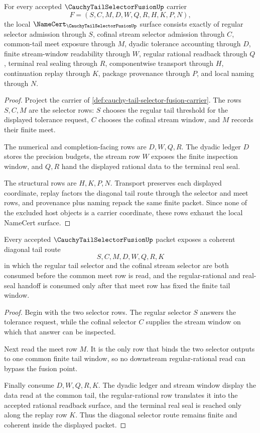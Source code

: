 \begin{theorem}
\label{thm:cauchy-tail-selector-fusion-namecert-obligations}
For every accepted $\CauchyTailSelectorFusionUp$ carrier
$$
F=(S,C,M,D,W,Q,R,H,K,P,N),
$$
the local $\NameCert_{\CauchyTailSelectorFusionUp}$ surface consists exactly of regular selector admission through $S$, cofinal stream selector admission through $C$, common-tail meet exposure through $M$, dyadic tolerance accounting through $D$, finite stream-window readability through $W$, regular rational readback through $Q$, terminal real sealing through $R$, componentwise transport through $H$, continuation replay through $K$, package provenance through $P$, and local naming through $N$.
\end{theorem}
\begin{proof}
Project the carrier of \autoref{def:cauchy-tail-selector-fusion-carrier}. The rows $S,C,M$ are the selector rows: $S$ chooses the regular tail threshold for the displayed tolerance request, $C$ chooses the cofinal stream window, and $M$ records their finite meet.

The numerical and completion-facing rows are $D,W,Q,R$. The dyadic ledger $D$ stores the precision budgets, the stream row $W$ exposes the finite inspection window, and $Q,R$ hand the displayed rational data to the terminal real seal.

The structural rows are $H,K,P,N$. Transport preserves each displayed coordinate, replay factors the diagonal tail route through the selector and meet rows, and provenance plus naming repack the same finite packet. Since none of the excluded host objects is a carrier coordinate, these rows exhaust the local NameCert surface.
\end{proof}

\begin{theorem}
\label{thm:cauchy-tail-selector-fusion-selector-coherence}
Every accepted $\CauchyTailSelectorFusionUp$ packet exposes a coherent diagonal tail route
$$
S,C,M,D,W,Q,R,K
$$
in which the regular tail selector and the cofinal stream selector are both consumed before the common meet row is read, and the regular-rational and real-seal handoff is consumed only after that meet row has fixed the finite tail window.
\end{theorem}
\begin{proof}
Begin with the two selector rows. The regular selector $S$ answers the tolerance request, while the cofinal selector $C$ supplies the stream window on which that answer can be inspected.

Next read the meet row $M$. It is the only row that binds the two selector outputs to one common finite tail window, so no downstream regular-rational read can bypass the fusion point.

Finally consume $D,W,Q,R,K$. The dyadic ledger and stream window display the data read at the common tail, the regular-rational row translates it into the accepted rational readback surface, and the terminal real seal is reached only along the replay row $K$. Thus the diagonal selector route remains finite and coherent inside the displayed packet.
\end{proof}

